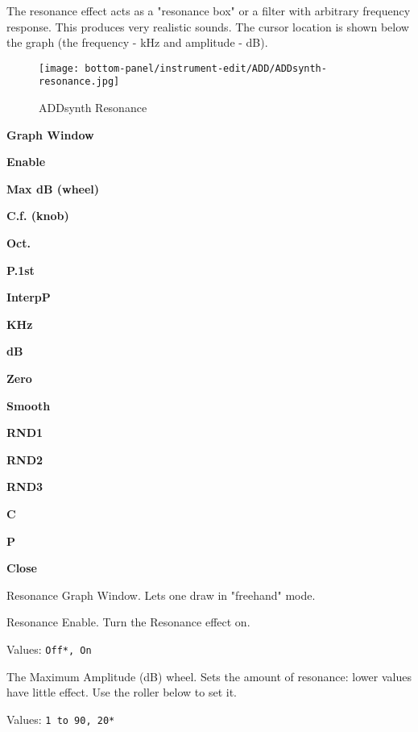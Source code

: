    The resonance effect acts as a "resonance box" or a filter with arbitrary
   frequency response. This produces very realistic sounds. 
   The cursor location is shown below the graph (the frequency - kHz and
   amplitude - dB). 

\begin{figure}[H]
   \centering 
   \texttt{[image: bottom-panel/instrument-edit/ADD/ADDsynth-resonance.jpg]}
   \caption{ADDsynth Resonance}
   \label{fig:addsynth_resonance}
\end{figure}

   \begin{enumber}
      \item \textbf{Graph Window}
      \item \textbf{Enable}
      \item \textbf{Max dB (wheel)}
      \item \textbf{C.f. (knob)}
      \item \textbf{Oct.}
      \item \textbf{P.1st}
      \item \textbf{InterpP}
      \item \textbf{KHz}
      \item \textbf{dB}
      \item \textbf{Zero}
      \item \textbf{Smooth}
      \item \textbf{RND1}
      \item \textbf{RND2}
      \item \textbf{RND3}
      \item \textbf{C}
      \item \textbf{P}
      \item \textbf{Close}
   \end{enumber}

   \setcounter{ItemCounter}{0}      %

   Resonance Graph Window.
   Lets one draw in "freehand" mode.

   Resonance Enable.
   Turn the Resonance effect on.

   Values: \texttt{Off*, On}

   The Maximum Amplitude (dB) wheel.
   Sets the amount of resonance: lower values have little effect. Use the
   roller below to set it. 

   Values: \texttt{1 to 90, 20*}

